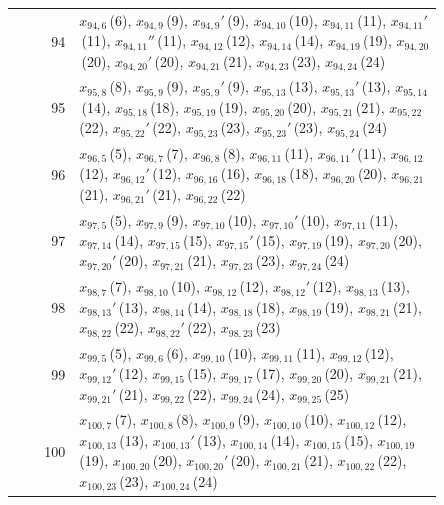 \documentclass[11pt]{article}
\begin{document}
\begin{center}
\begin{longtable}{r>{\raggedright\arraybackslash}p{0.85\linewidth}}
94 & $x_{94,6}$\,(6), $x_{94,9}$\,(9), $x_{94,9}'$\,(9), $x_{94,10}$\,(10), $x_{94,11}$\,(11), $x_{94,11}'$\,(11), $x_{94,11}''$\,(11), $x_{94,12}$\,(12), $x_{94,14}$\,(14), $x_{94,19}$\,(19), $x_{94,20}$\,(20), $x_{94,20}'$\,(20), $x_{94,21}$\,(21), $x_{94,23}$\,(23), $x_{94,24}$\,(24) \\
95 & $x_{95,8}$\,(8), $x_{95,9}$\,(9), $x_{95,9}'$\,(9), $x_{95,13}$\,(13), $x_{95,13}'$\,(13), $x_{95,14}$\,(14), $x_{95,18}$\,(18), $x_{95,19}$\,(19), $x_{95,20}$\,(20), $x_{95,21}$\,(21), $x_{95,22}$\,(22), $x_{95,22}'$\,(22), $x_{95,23}$\,(23), $x_{95,23}'$\,(23), $x_{95,24}$\,(24) \\
96 & $x_{96,5}$\,(5), $x_{96,7}$\,(7), $x_{96,8}$\,(8), $x_{96,11}$\,(11), $x_{96,11}'$\,(11), $x_{96,12}$\,(12), $x_{96,12}'$\,(12), $x_{96,16}$\,(16), $x_{96,18}$\,(18), $x_{96,20}$\,(20), $x_{96,21}$\,(21), $x_{96,21}'$\,(21), $x_{96,22}$\,(22) \\
97 & $x_{97,5}$\,(5), $x_{97,9}$\,(9), $x_{97,10}$\,(10), $x_{97,10}'$\,(10), $x_{97,11}$\,(11), $x_{97,14}$\,(14), $x_{97,15}$\,(15), $x_{97,15}'$\,(15), $x_{97,19}$\,(19), $x_{97,20}$\,(20), $x_{97,20}'$\,(20), $x_{97,21}$\,(21), $x_{97,23}$\,(23), $x_{97,24}$\,(24) \\
98 & $x_{98,7}$\,(7), $x_{98,10}$\,(10), $x_{98,12}$\,(12), $x_{98,12}'$\,(12), $x_{98,13}$\,(13), $x_{98,13}'$\,(13), $x_{98,14}$\,(14), $x_{98,18}$\,(18), $x_{98,19}$\,(19), $x_{98,21}$\,(21), $x_{98,22}$\,(22), $x_{98,22}'$\,(22), $x_{98,23}$\,(23) \\
99 & $x_{99,5}$\,(5), $x_{99,6}$\,(6), $x_{99,10}$\,(10), $x_{99,11}$\,(11), $x_{99,12}$\,(12), $x_{99,12}'$\,(12), $x_{99,15}$\,(15), $x_{99,17}$\,(17), $x_{99,20}$\,(20), $x_{99,21}$\,(21), $x_{99,21}'$\,(21), $x_{99,22}$\,(22), $x_{99,24}$\,(24), $x_{99,25}$\,(25) \\
100 & $x_{100,7}$\,(7), $x_{100,8}$\,(8), $x_{100,9}$\,(9), $x_{100,10}$\,(10), $x_{100,12}$\,(12), $x_{100,13}$\,(13), $x_{100,13}'$\,(13), $x_{100,14}$\,(14), $x_{100,15}$\,(15), $x_{100,19}$\,(19), $x_{100,20}$\,(20), $x_{100,20}'$\,(20), $x_{100,21}$\,(21), $x_{100,22}$\,(22), $x_{100,23}$\,(23), $x_{100,24}$\,(24) \\
\end{longtable}
\end{center}
\end{document}
